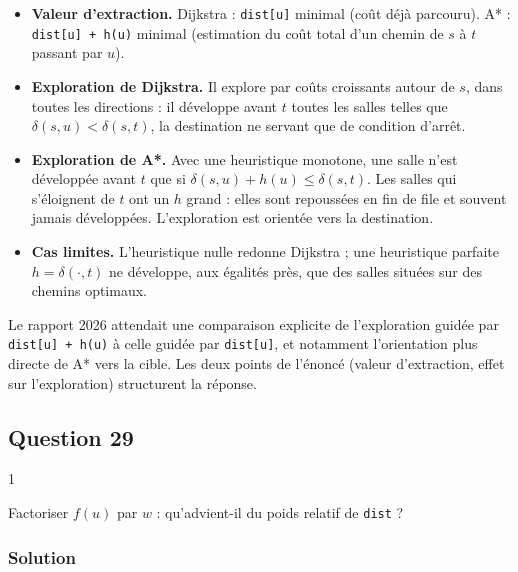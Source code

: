 \documentclass[11pt,a4paper]{article}
\providecommand{\tightlist}{\setlength{\itemsep}{0pt}\setlength{\parskip}{0pt}}
\begin{document}
\begin{itemize}
\tightlist
\item
  \textbf{Valeur d'extraction.} Dijkstra : \texttt{dist{[}u{]}} minimal (coût déjà parcouru). A* : \texttt{dist{[}u{]}\ +\ h(u)} minimal (estimation du coût total d'un chemin de \(s\) à \(t\) passant par \(u\)).
\item
  \textbf{Exploration de Dijkstra.} Il explore par coûts croissants autour de \(s\), dans toutes les directions : il développe avant \(t\) toutes les salles telles que \(\delta(s,u) < \delta(s,t)\), la destination ne servant que de condition d'arrêt.
\item
  \textbf{Exploration de A*.} Avec une heuristique monotone, une salle n'est développée avant \(t\) que si \(\delta(s,u) + h(u) \le \delta(s,t)\). Les salles qui s'éloignent de \(t\) ont un \(h\) grand : elles sont repoussées en fin de file et souvent jamais développées. L'exploration est orientée vers la destination.
\item
  \textbf{Cas limites.} L'heuristique nulle redonne Dijkstra ; une heuristique parfaite \(h = \delta(\cdot,t)\) ne développe, aux égalités près, que des salles situées sur des chemins optimaux.
\end{itemize}

\begin{jury}

Le rapport 2026 attendait une comparaison explicite de l'exploration guidée par \texttt{dist{[}u{]}\ +\ h(u)} à celle guidée par \texttt{dist{[}u{]}}, et notamment l'orientation plus directe de A* vers la cible. Les deux points de l'énoncé (valeur d'extraction, effet sur l'exploration) structurent la réponse.

\end{jury}

\hypertarget{question-29}{%
\subsection{Question 29}\label{question-29}}

\begin{indication}{1}

Factoriser \(f(u)\) par \(w\) : qu'advient-il du poids relatif de \texttt{dist} ?

\end{indication}

\hypertarget{solution-28}{%
\subsubsection{Solution}\label{solution-28}}
\end{document}

